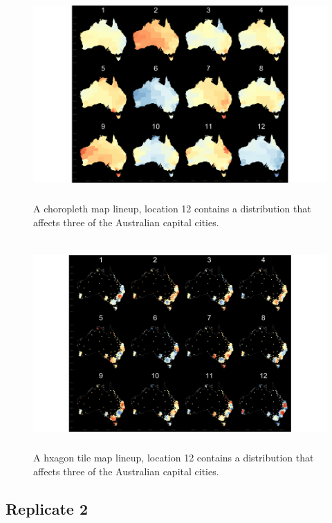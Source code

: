 \documentclass{monashthesis}
\begin{document}
\begin{figure}[H]
\centering
\includegraphics[height=8cm]{lineups/three-geo12-1.pdf}
\caption{\label{fig:three-geo12}A choropleth map lineup, location 12 contains a distribution that affects three of the Australian capital cities.}
\end{figure}

\begin{figure}[H]
\centering
\includegraphics[height=8cm]{lineups/three-hex12-1.pdf}
\caption{\label{fig:three-hex12}A hxagon tile map lineup, location 12 contains a distribution that affects three of the Australian capital cities.}
\end{figure}

\hypertarget{replicate-2-1}{%
\subsection{Replicate 2}\label{replicate-2-1}}
\end{document}
